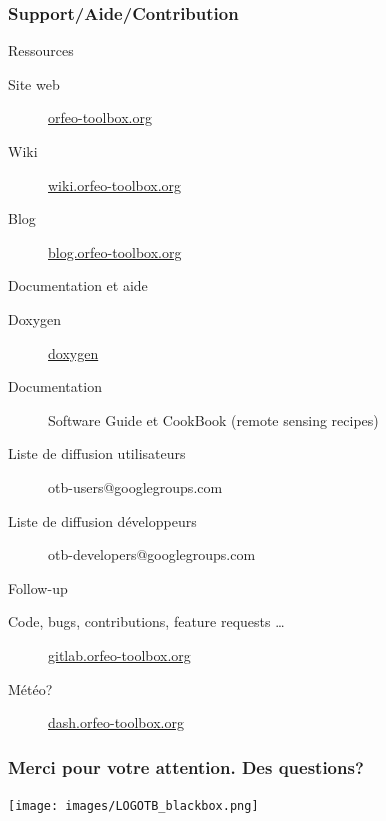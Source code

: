 \documentclass[8pt]{beamer}
\begin{document}
\begin{frame}
\frametitle{Support/Aide/Contribution}
\vspace{-0.2cm}
\begin{block}{Ressources}
\vspace{-0.2cm}
\begin{description}
\item[Site web] \href{http://www.orfeo-toolbox.org}{orfeo-toolbox.org}
\item[Wiki] \href{http://wiki.orfeo-toolbox.org}{wiki.orfeo-toolbox.org}
\item[Blog] \href{http://blog.orfeo-toolbox.org}{blog.orfeo-toolbox.org}
\end{description}
\end{block}
\vspace{-0.2cm}
\begin{block}{Documentation et aide}
\vspace{-0.2cm}
\begin{description}
\item[Doxygen] \href{http://www.orfeo-toolbox.org/doxygen/}{doxygen}
\item[Documentation] Software Guide et CookBook (remote sensing recipes)
\item[Liste de diffusion utilisateurs] otb-users@googlegroups.com
\item[Liste de diffusion développeurs] otb-developers@googlegroups.com
\end{description}
\end{block}
\vspace{-0.2cm}
\begin{block}{Follow-up}
\vspace{-0.2cm}
\begin{description}
\item[Code, bugs, contributions, feature requests \ldots] \href{https://gitlab.orfeo-toolbox.org/orfeotoolbox/otb}{gitlab.orfeo-toolbox.org}
\item[Météo?] \href{http://dash.orfeo-toolbox.org}{dash.orfeo-toolbox.org}
\end{description}
\end{block}
\end{frame}

\begin{frame}
\frametitle{Merci pour votre attention. Des questions?}
\begin{minipage}[t][6cm][t]{\textwidth}
\begin{center}
\texttt{[image: images/LOGOTB\_blackbox.png]}
\end{center}
\end{minipage}
\end{frame}
\end{document}
